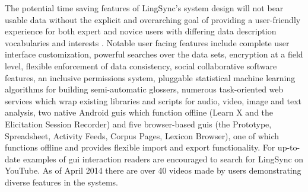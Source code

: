\documentclass[11pt]{article}
\newcommand{\smalltodo}[2][]
    {\todo[caption={#2}, #1]
    {\tiny#2\normalsize}}
\begin{document}
The potential time saving features of LingSync's system design will not bear
usable data without the explicit and overarching goal of providing a user-friendly 
experience for both expert and novice users with differing data description vocabularies and interests \cite{Troy:2014}.  Notable user facing
features include complete user interface customization, powerful searches over the data sets, encryption at a field
level, flexible enforcement of data consistency, social collaborative software
features, an inclusive permissions system, pluggable statistical machine
learning algorithms for building semi-automatic glossers, numerous task-oriented web services which wrap existing libraries and scripts for audio,
video, image and text analysis, two native Android \glspl{gui} which function
offline (Learn X and the Elicitation Session Recorder) and five browser-based
\glspl{gui} (the Prototype, Spreadsheet,  Activity Feeds, Corpus Pages, 
Lexicon Browser), one of which functions offline and provides flexible import
and export functionality.  For up-to-date examples of \gls{gui} interaction
readers are encouraged to search for LingSync on YouTube. As of April 2014
there are over 40 videos made by users demonstrating diverse features in the
systems.

\end{document}
